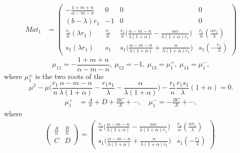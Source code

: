 \documentclass[a4paper,11pt]{article}
\begin{document}
\hrulefill
\begin{align*}
 Mat_1 &= \begin{pmatrix}
          -\frac{1+m+n}{\alpha-m-n} & 0 & 0 & 0\\
          (b-\lambda)r_1 & -1 & 0 & 0\\
          \frac{r_1}{n}(\lambda r_1) & \frac{r_1}{n} & \frac{r_1}{n}\Big(\frac{\alpha-m-n}{\lambda(1+\alpha)} - \frac{n\alpha}{\lambda(1+\alpha)r_1}\Big) & \frac{r_1}{n}(\frac{\alpha r_1}{\lambda})\\
          s_1(\lambda r_1) & s_1 & s_1\Big(\frac{\alpha-m-n}{\lambda(1+\alpha)} + \frac{n}{\lambda(1+\alpha)r_1}\Big) & s_1(-\frac{r_1}{\lambda})
         \end{pmatrix}
\end{align*}
\begin{equation}
 \mu_{11}=-\frac{1+m+n}{\alpha-m-n}, \ \mu_{12}=-1, \ \mu_{13}=\mu_1^+, \ \mu_{14}=\mu_1^-,
\end{equation}
where $\mu_1^\pm$ is the two roots of the 
$$ \mu^2 - \mu\Big(\frac{r_1}{n}\frac{\alpha-m-n}{\lambda(1+\alpha)} - \frac{r_1s_1}{\lambda} - \frac{\alpha}{\lambda(1+\alpha)}\Big) - \frac{r_1}{n}\frac{r_1s_1}{\lambda}(1+\alpha) = 0.$$
\begin{align*}
 \mu_1^+ &= \frac{A}{n} + D + \frac{BC}{A} + \cdots, \quad \mu_1^- = - \frac{BC}{A} + \cdots,
\end{align*}
where
\begin{align*}
 \begin{pmatrix} \frac{A}{n} & \frac{B}{n} \\ C & D \end{pmatrix} = 
 \begin{pmatrix}
 \frac{r_1}{n}\Big(\frac{\alpha-m-n}{\lambda(1+\alpha)} - \frac{n\alpha}{\lambda(1+\alpha)r_1}\Big) & \frac{r_1}{n}(\frac{\alpha r_1}{\lambda})\\
 s_1\Big(\frac{\alpha-m-n}{\lambda(1+\alpha)} + \frac{n}{\lambda(1+\alpha)r_1}\Big) & s_1(-\frac{r_1}{\lambda})
 \end{pmatrix}.
\end{align*}
\end{document}
